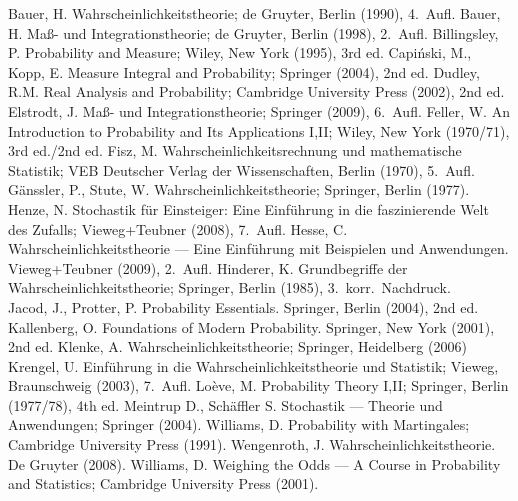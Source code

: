 % 
%  
\begin{thebibliography}{99}

 Bauer, H. Wahrscheinlichkeitstheorie; de Gruyter, Berlin
  (1990), 4.\ Aufl.
 Bauer, H. Maß- und Integrationstheorie; de Gruyter, Berlin
  (1998), 2.~Aufl.
 Billingsley, P. Probability and Measure; Wiley, New York
  (1995), 3rd ed.
 Capi\'{n}ski, M., Kopp, E. Measure Integral and
  Probability; Springer (2004), 2nd ed.
 Dudley, R.M. Real Analysis and Probability; Cambridge
  University Press (2002), 2nd ed.
 Elstrodt, J. Maß- und Integrationstheorie; Springer (2009),
  6.~Aufl.
 Feller, W. An Introduction to Probability and Its
  Applications I,II; Wiley, New York (1970/71), 3rd ed./2nd ed.
 Fisz, M. Wahrscheinlichkeitsrechnung und mathematische
  Statistik; VEB Deutscher Verlag der Wissenschaften, Berlin (1970),
  5.\ Aufl.
 Gänssler, P., Stute, W. Wahrscheinlichkeitstheorie;
  Springer, Berlin (1977).
 Henze, N. Stochastik für Einsteiger: Eine Einführung in die
  faszinierende Welt des Zufalls; Vieweg+Teubner (2008), 7.~Aufl.
 Hesse, C. Wahrscheinlichkeitstheorie --- Eine Einführung mit
  Beispielen und Anwendungen. Vieweg+Teubner (2009), 2.~Aufl.
 Hinderer, K. Grundbegriffe der Wahrscheinlichkeitstheorie;
  Springer, Berlin (1985), 3.~korr.\ Nachdruck.\\[-8mm]
 Jacod, J., Protter, P. Probability
  Essentials. Springer, Berlin (2004), 2nd ed.
 Kallenberg, O.  Foundations of Modern
  Probability. Springer, New York (2001), 2nd ed.
 Klenke, A. Wahrscheinlichkeitstheorie; Springer, Heidelberg
  (2006)
 Krengel, U. Einführung in die Wahrscheinlichkeitstheorie und
  Statistik; Vieweg, Braunschweig (2003), 7.\ Aufl.
 Loève, M. Probability Theory I,II; Springer, Berlin (1977/78),
  4th ed.
 Meintrup D., Schäffler S. Stochastik --- Theorie
  und Anwendungen; Springer (2004).
 Williams, D. Probability with Martingales; Cambridge
  University Press (1991).
 Wengenroth, J. Wahrscheinlichkeitstheorie. De Gruyter
  (2008).
 Williams, D. Weighing the Odds --- A Course in Probability
  and Statistics; Cambridge University Press (2001).

\end{thebibliography}

